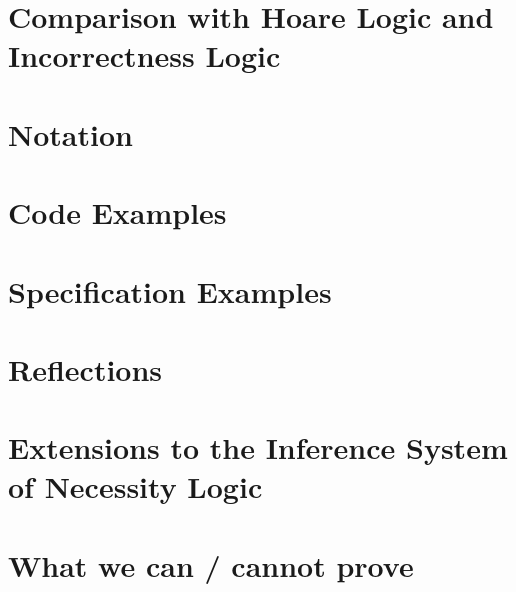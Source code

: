 \documentclass[11pt]{article} %
\theoremstyle{definition}
\begin{document}
\section{Comparison with Hoare Logic and Incorrectness Logic}


\section{Notation}


\section{Code Examples}


\section{Specification Examples}


\section{Reflections}


\section{Extensions to the Inference System of Necessity Logic}


\section{What we can / cannot prove}

\end{document}
